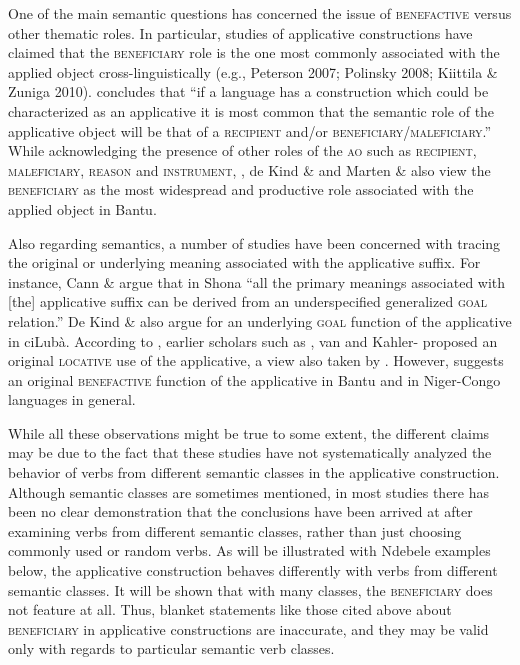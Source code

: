 \documentclass[output=paper]{langsci/langscibook}
\begin{document}
One of the main semantic questions has concerned the issue of \textsc{benefactive} versus other thematic roles. In particular, studies of applicative constructions have claimed that the \textsc{beneficiary} role is the one most commonly associated with the applied object cross-linguistically (e.g., Peterson 2007; Polinsky 2008; Kiittila \& Zuniga 2010). \citet[40]{Peterson2007} concludes that “if a language has a construction which could be characterized as an applicative it is most common that the semantic role of the applicative object will be that of a \textsc{recipient} and/or \textsc{beneficiary}/\textsc{maleficiary.”} While acknowledging the presence of other roles of the \textsc{ao} such as \textsc{recipient}, \textsc{maleficiary}, \textsc{reason} and \textsc{instrument}, \citet{Schadeberg2003}, de Kind \& \citet[101]{Bostoen2012} and Marten \& \citet[1]{Kula2014} also view the \textsc{beneficiary} as the most widespread and productive role associated with the applied object in Bantu. 

Also regarding semantics, a number of studies have been concerned with tracing the original or underlying meaning associated with the applicative suffix. For instance, Cann \& \citet[3]{Mabhugu2007} argue that in Shona “all the primary meanings associated with [the] applicative suffix can be derived from an underspecified generalized \textsc{goal} relation.” De Kind \& \citet{Bostoen2012} also argue for an underlying \textsc{goal} function of the applicative in ciLubà. According to \citet{Trithart1983}, earlier scholars such as \citet{Endemann1876}, van \citet{Eeden1956} and Kahler-\citet{Mayer1966} proposed an original \textsc{locative} use of the applicative, a view also taken by \citet[74]{Schadeberg2003}. However, \citet[75]{Trithart1983} suggests an original \textsc{benefactive} function of the applicative in Bantu and in Niger-Congo languages in general. 

While all these observations might be true to some extent, the different claims may be due to the fact that these studies have not systematically analyzed the behavior of verbs from different semantic classes in the applicative construction. Although semantic classes are sometimes mentioned, in most studies there has been no clear demonstration that the conclusions have been arrived at after examining verbs from different semantic classes, rather than just choosing commonly used or random verbs. As will be illustrated with Ndebele examples below, the applicative construction behaves differently with verbs from different semantic classes. It will be shown that with many classes, the \textsc{beneficiary} does not feature at all. Thus, blanket statements like those cited above about \textsc{beneficiary} in applicative constructions are inaccurate, and they may be valid only with regards to particular semantic verb classes.
\end{document}
